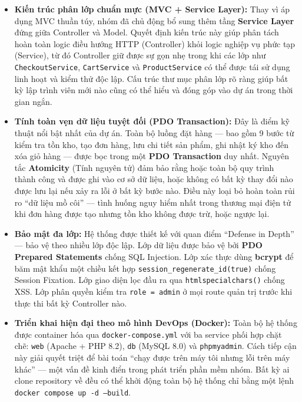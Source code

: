 \documentclass[11pt, a4paper]{article}
\begin{document}
\begin{itemize}[leftmargin=*]
    \item \textbf{Kiến trúc phân lớp chuẩn mực (MVC + Service Layer):}
    Thay vì áp dụng MVC thuần túy, nhóm đã chủ động bổ sung thêm tầng
    \textbf{Service Layer} đứng giữa Controller và Model. Quyết định kiến trúc
    này giúp phân tách hoàn toàn logic điều hướng HTTP (Controller) khỏi
    logic nghiệp vụ phức tạp (Service), từ đó Controller giữ được sự gọn nhẹ
    trong khi các lớp như \texttt{CheckoutService}, \texttt{CartService} và
    \texttt{ProductService} có thể được tái sử dụng linh hoạt và kiểm thử
    độc lập. Cấu trúc thư mục phân lớp rõ ràng giúp bất kỳ lập trình viên
    mới nào cũng có thể hiểu và đóng góp vào dự án trong thời gian ngắn.

    \item \textbf{Tính toàn vẹn dữ liệu tuyệt đối (PDO Transaction):}
    Đây là điểm kỹ thuật nổi bật nhất của dự án. Toàn bộ luồng đặt hàng ---
    bao gồm 9 bước từ kiểm tra tồn kho, tạo đơn hàng, lưu chi tiết sản phẩm,
    ghi nhật ký kho đến xóa giỏ hàng --- được bọc trong một \textbf{PDO
    Transaction} duy nhất. Nguyên tắc \textbf{Atomicity} (Tính nguyên tử)
    đảm bảo rằng hoặc toàn bộ quy trình thành công và được ghi vào cơ sở
    dữ liệu, hoặc không có bất kỳ thay đổi nào được lưu lại nếu xảy ra lỗi
    ở bất kỳ bước nào. Điều này loại bỏ hoàn toàn rủi ro ``dữ liệu mồ côi''
    --- tình huống nguy hiểm nhất trong thương mại điện tử khi đơn hàng được
    tạo nhưng tồn kho không được trừ, hoặc ngược lại.

    \item \textbf{Bảo mật đa lớp:}
    Hệ thống được thiết kế với quan điểm ``Defense in Depth'' --- bảo vệ theo
    nhiều lớp độc lập. Lớp dữ liệu được bảo vệ bởi \textbf{PDO Prepared
    Statements} chống SQL Injection. Lớp xác thực dùng \textbf{bcrypt} để
    băm mật khẩu một chiều kết hợp \texttt{session\_regenerate\_id(true)}
    chống Session Fixation. Lớp giao diện lọc đầu ra qua
    \texttt{htmlspecialchars()} chống XSS. Lớp phân quyền kiểm tra
    \texttt{role = admin} ở mọi route quản trị trước khi thực thi bất kỳ
    Controller nào.

    \item \textbf{Triển khai hiện đại theo mô hình DevOps (Docker):}
    Toàn bộ hệ thống được container hóa qua \texttt{docker-compose.yml} với
    ba service phối hợp chặt chẽ: \texttt{web} (Apache + PHP 8.2),
    \texttt{db} (MySQL 8.0) và \texttt{phpmyadmin}. Cách tiếp cận này giải
    quyết triệt để bài toán ``chạy được trên máy tôi nhưng lỗi trên máy
    khác'' --- một vấn đề kinh điển trong phát triển phần mềm nhóm. Bất kỳ
    ai clone repository về đều có thể khởi động toàn bộ hệ thống chỉ bằng
    một lệnh \texttt{docker compose up -d --build}.


\end{itemize}
\end{document}
